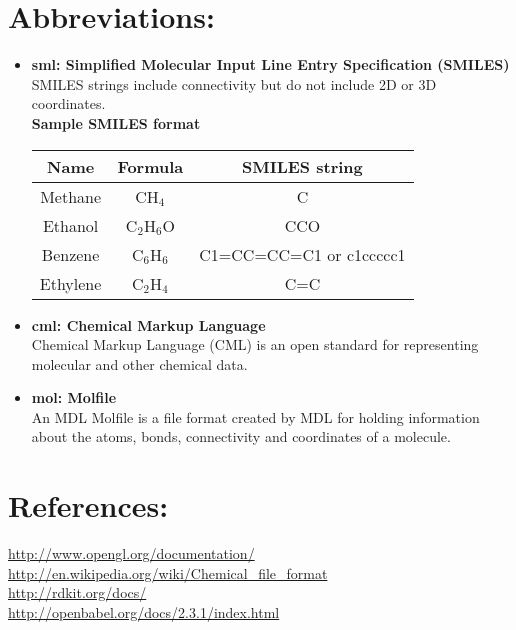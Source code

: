 \documentclass{report}
\begin{document}
\section*{Abbreviations:}
\begin{itemize}
	\item	\textbf{sml: Simplified Molecular Input Line Entry Specification (SMILES)}\\
	SMILES strings include connectivity but do not include 2D or 3D coordinates.\\
\textbf{ Sample SMILES format}\\
\begin{tabular}{|c|c|c|}
\hline 
\textbf{Name} & \textbf{Formula} & \textbf{SMILES string} \\ 
\hline 
Methane & CH$_4$ & C \\ 
\hline 
Ethanol & C$_2$H$_6$O & CCO\\ 
\hline 
Benzene & C$_6$H$_6$ & C1=CC=CC=C1 or c1ccccc1\\ 
\hline 
Ethylene & C$_2$H$_4$& C=C\\ 
\hline 
\end{tabular} 
	\item	\textbf{cml: Chemical Markup Language}\\Chemical Markup Language (CML) is an open standard for representing molecular and other chemical data.
	\item	\textbf{mol: Molfile}\\
	An MDL Molfile is a file format created by MDL for holding information about the atoms, bonds, connectivity and coordinates of a molecule.
\end{itemize}

\section*{References:}
\url{http://www.opengl.org/documentation/}\\
\url{http://en.wikipedia.org/wiki/Chemical_file_format}\\
\url{http://rdkit.org/docs/}\\
\url{http://openbabel.org/docs/2.3.1/index.html}\\
\end{document}

